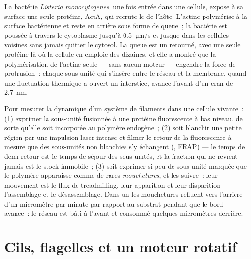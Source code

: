 \begin{example}\label{ex:b3:cytoskeleton-motility:listeria}
La bactérie \emph{Listeria monocytogenes}, une fois entrée dans une
cellule, expose à sa surface une seule protéine, ActA, qui recrute le
 de l'hôte. L'actine polymérise à la surface bactérienne
et reste en arrière sous forme de queue~; la bactérie est poussée à
travers le cytoplasme jusqu'à \qty{0.5}{\micro m/s} et jusque dans les
cellules voisines sans jamais quitter le cytosol. La queue est un
 retourné, avec une seule protéine là où la cellule en
emploie des dizaines, et elle a montré que la polymérisation de
l'actine seule --- sans aucun moteur --- engendre la force de
protrusion~: chaque sous-unité qui s'insère entre le réseau et la
membrane, quand une fluctuation thermique a ouvert un interstice,
avance l'avant d'un cran de \qty{2.7}{nm}.
\end{example}

\begin{method}\label{met:b3:cytoskeleton-motility:frap}
Pour mesurer la dynamique d'un système de filaments dans une cellule
vivante~: (1) exprimer la sous-unité fusionnée à une protéine
fluorescente à bas niveau, de sorte qu'elle soit incorporée au polymère
endogène~; (2) soit blanchir une petite région par une impulsion laser
intense et filmer le retour de la fluorescence à mesure que des
sous-unités non blanchies s'y échangent (\emph{}, FRAP) --- le temps de demi-retour
est le temps de séjour des sous-unités, et la fraction qui ne revient
jamais est le stock immobile~; (3) soit exprimer si peu de sous-unité
marquée que le polymère apparaisse comme de rares \emph{mouchetures},
et les suivre~: leur mouvement est le flux de treadmilling, leur
apparition et leur disparition l'assemblage et le désassemblage. Dans
un  les mouchetures refluent vers l'arrière d'un micromètre
par minute par rapport au substrat pendant que le bord avance~: le
réseau est bâti à l'avant et consommé quelques micromètres derrière.
\end{method}

\section{Cils, flagelles et un moteur rotatif}


